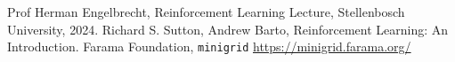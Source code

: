 \begin{thebibliography}{1}
 Prof Herman Engelbrecht, Reinforcement Learning Lecture, Stellenbosch University, 2024.
  Richard S. Sutton, Andrew Barto, Reinforcement Learning: An Introduction.
 Farama Foundation, \texttt{minigrid} \href{https://minigrid.farama.org/}{https://minigrid.farama.org/}
\end{thebibliography}